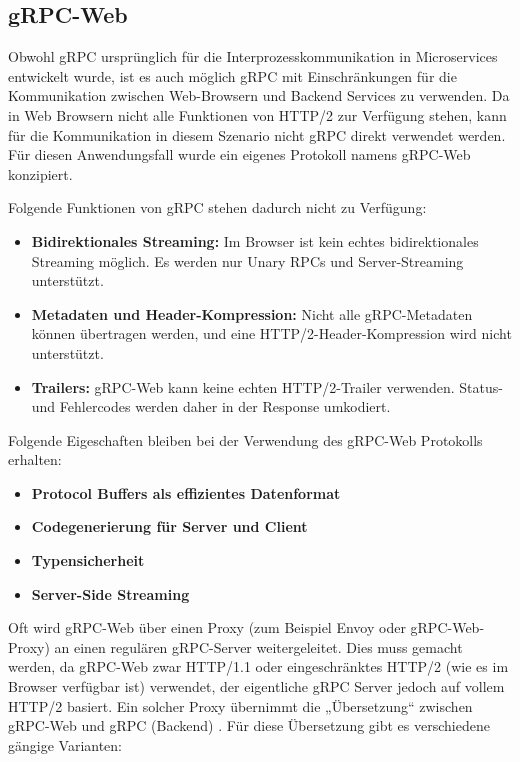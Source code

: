 \clearpage
\subsection{gRPC-Web}
Obwohl gRPC ursprünglich für die Interprozesskommunikation in Microservices entwickelt wurde, ist es auch möglich gRPC mit Einschränkungen für die Kommunikation zwischen Web-Browsern und Backend Services zu verwenden.
Da in Web Browsern nicht alle Funktionen von HTTP/2 zur Verfügung stehen, kann für die Kommunikation in diesem Szenario nicht gRPC direkt verwendet werden. Für diesen Anwendungsfall wurde ein eigenes Protokoll namens gRPC-Web konzipiert. 
 

Folgende Funktionen von gRPC stehen dadurch nicht zu Verfügung:

\begin{itemize}
	\item \textbf{Bidirektionales Streaming:} 
	Im Browser ist kein echtes bidirektionales Streaming möglich. 
	Es werden nur Unary RPCs und Server-Streaming unterstützt.
	
	\item \textbf{Metadaten und Header-Kompression:} 
	Nicht alle gRPC-Metadaten können übertragen werden, und eine HTTP/2-Header-Kompression wird nicht unterstützt.
	
	\item \textbf{Trailers:} 
	gRPC-Web kann keine echten HTTP/2-Trailer verwenden. 
	Status- und Fehlercodes werden daher in der Response umkodiert.
\end{itemize}

Folgende Eigeschaften bleiben bei der Verwendung des gRPC-Web Protokolls erhalten:

\begin{itemize}
	\item \textbf{Protocol Buffers als effizientes Datenformat} 
	\item \textbf{Codegenerierung für Server und Client} 
	\item \textbf{Typensicherheit}
	\item \textbf{Server-Side Streaming} 	
\end{itemize}



Oft wird gRPC-Web über einen Proxy (zum Beispiel Envoy oder gRPC-Web-Proxy) an einen regulären gRPC-Server weitergeleitet. Dies muss gemacht werden, da gRPC-Web zwar HTTP/1.1 oder eingeschränktes HTTP/2 (wie es im Browser verfügbar ist) verwendet, der eigentliche gRPC Server jedoch auf vollem HTTP/2 basiert. Ein solcher Proxy übernimmt die „Übersetzung“ zwischen gRPC-Web und gRPC (Backend) \parencite{Brandhorst2019}. Für diese Übersetzung gibt es verschiedene gängige Varianten:

